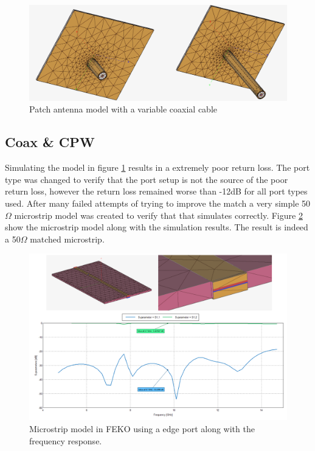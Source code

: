     \begin{figure}[H]
    \centering
    \includegraphics[width=0.65\linewidth]{Figures/chp3_patch_coax_port.png}
    \caption{Patch antenna model with a variable coaxial cable}
    \label{fig:chp3_patch_coax_port}
    \end{figure}

\subsection{Coax \& CPW}
Simulating the model in figure \ref{fig:chp3_patch_coax_port} results in a extremely poor return loss. The port type was changed to verify that the port setup is not the source of the poor return loss, however the return loss remained worse than -12dB for all port types used. After many failed attempts of trying to improve the match a very simple 50$\Omega$ microstrip model was created to verify that that simulates correctly. Figure \ref{fig:chp3_microstrip_edge_port_combined} show the microstrip model along with the simulation results. The result is indeed a 50$\Omega$ matched microstrip.

    \begin{figure}[H]
    \centering
    \includegraphics[width=0.8\linewidth]{Figures/chp3_microstrip_edge_port_combined.png}
    \caption{Microstrip model in FEKO using a edge port along with the frequency response.}
    \label{fig:chp3_microstrip_edge_port_combined}
    \end{figure}

